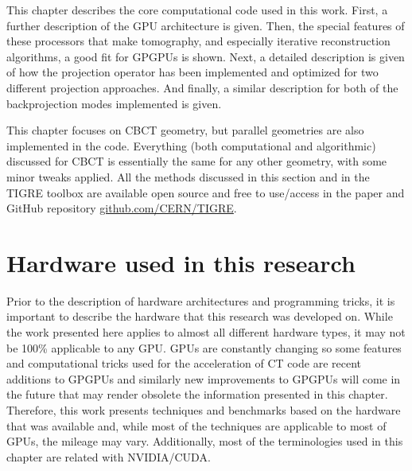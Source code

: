 
This chapter describes the core computational code used in this work. First, a further description of the GPU architecture is given. Then, the special features of these processors that make tomography, and especially iterative reconstruction algorithms, a good fit for GPGPUs is shown. Next, a detailed description is given of how the projection operator has been implemented and optimized for two different projection approaches.  And finally, a similar description for both of the backprojection modes implemented is given.


This chapter focuses on CBCT geometry, but parallel geometries are also implemented in the code. Everything (both computational and algorithmic) discussed for CBCT is essentially the same for any other geometry, with some minor tweaks applied. All the methods discussed in this section and in the TIGRE toolbox are available open source and free to use/access in the paper\cite{TIGRE} and GitHub repository \href{https://github.com/CERN/TIGRE}{github.com/CERN/TIGRE}.

\section{Hardware used in this research}
Prior to the description of hardware architectures and programming tricks, it is important to describe the hardware that this research was developed on. While the work presented here applies to almost all different hardware types, it may not be 100\% applicable to any GPU. GPUs are constantly changing so some features and computational tricks used for the acceleration of CT code are recent additions to GPGPUs and similarly new improvements to GPGPUs will come in the future that may render obsolete the information presented in this chapter. Therefore, this work presents techniques and benchmarks based on the hardware that was available and, while most of the techniques are applicable to most of GPUs, the mileage may vary. Additionally, most of the terminologies used in this chapter are related with NVIDIA/CUDA.

